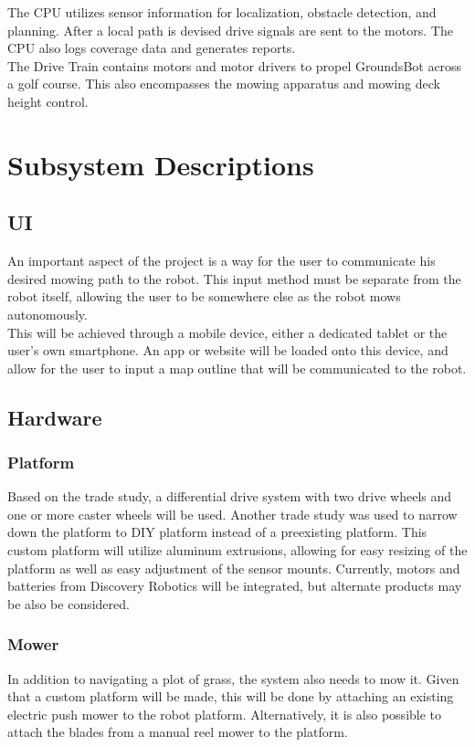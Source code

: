 \documentclass[12pt]{extarticle}
\begin{document}
  The CPU utilizes sensor information for localization, obstacle detection, and planning.  After a local path is devised drive signals are sent to the motors. The CPU also logs coverage data and generates reports.\\

  The Drive Train contains motors and motor drivers to propel GroundsBot across a golf course.  This also encompasses the mowing apparatus and mowing deck height control. \\



\newpage
\section{Subsystem Descriptions}
	\subsection{UI}
	An important aspect of the project is a way for the user to communicate his desired mowing path to the robot. This input method must be separate from the robot itself, allowing the user to be somewhere else as the robot mows autonomously. \\
	
	This will be achieved through a mobile device, either a dedicated tablet or the user's own smartphone. An app or website will be loaded onto this device, and allow for the user to input a map outline that will be communicated to the robot. 
	
	\subsection{Hardware}
		\subsubsection{Platform}
			Based on the trade study, a differential drive system with two drive wheels and one or more caster wheels will be used. Another trade study was used to narrow down the platform to DIY platform instead of a preexisting platform. This custom platform will utilize aluminum extrusions, allowing for easy resizing of the platform as well as easy adjustment of the sensor mounts. Currently, motors and batteries from Discovery Robotics will be integrated, but alternate products may be also be considered. 
			
		\subsubsection{Mower}
			In addition to navigating a plot of grass, the system also needs to mow it. Given that a custom platform will be made, this will be done by attaching an existing electric push mower to the robot platform. Alternatively, it is also possible to attach the blades from a manual reel mower to the platform. 
	
\end{document}
